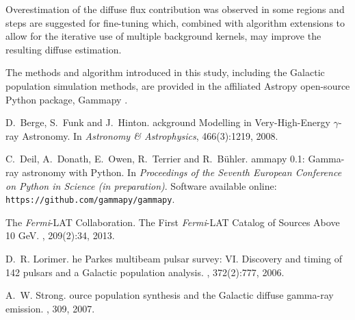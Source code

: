 \documentclass{PoS}
\begin{document}
Overestimation of the diffuse flux contribution was observed in some regions and steps are suggested for fine-tuning which, combined with algorithm extensions to allow for the iterative use of multiple background kernels, may improve the resulting diffuse estimation.

The methods and algorithm introduced in this study, including the Galactic population simulation methods, are provided in the affiliated Astropy open-source Python package, Gammapy \cite{Deil}.

\begin{thebibliography}{99}

D.~Berge, S.~Funk and J.~Hinton.
ackground {M}odelling in {V}ery-{H}igh-{E}nergy $\gamma$-ray {A}stronomy.
\newblock In {\em {A}stronomy \& {A}strophysics}, 466(3):1219, 2008.

C.~Deil, A.~Donath, E.~Owen, R.~Terrier and R.~B{\"{u}}hler.
ammapy {0.1}: {G}amma-ray astronomy with {P}ython.
\newblock In {\em {P}roceedings of the {S}eventh {E}uropean {C}onference on
  {P}ython in {S}cience (in preparation)}.
\newblock Software available online: {\verb|https://github.com/gammapy/gammapy|}.

{The \textit{Fermi}-LAT Collaboration}.
\newblock The {F}irst {\textit{Fermi}-LAT} {C}atalog of {S}ources {A}bove 10 {GeV}.
, 209(2):34, 2013.

D.~R. Lorimer.
he {P}arkes multibeam pulsar survey: {VI.} {D}iscovery and timing
  of 142 pulsars and a {G}alactic population analysis.
, 372(2):777,
  2006.

A.~W. Strong.
ource population synthesis and the {G}alactic diffuse gamma-ray
  emission.
, 309, 2007.


\end{thebibliography}
\end{document}
